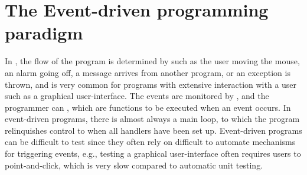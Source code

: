 \chapter{The Event-driven programming paradigm}
\label{chap:eventDriven}

In , the flow of the program is determined by  such as the user moving the mouse, an alarm going off, a message arrives from another program, or an exception is thrown, and is very common for programs with extensive interaction with a user such as a graphical user-interface. The events are monitored by , and the programmer can , which are  functions to be executed when an event occurs. In event-driven programs, there is almost always a main loop, to which the program relinquishes control to when all handlers have been set up. Event-driven programs can be difficult to test since they often rely on difficult to automate mechanisms for triggering events, e.g., testing a graphical user-interface often requires users to point-and-click, which is very slow compared to automatic unit testing.


